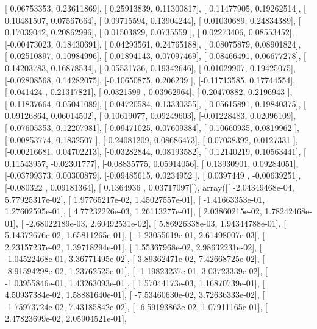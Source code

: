 \documentclass{article}
\begin{document}
       [ 0.06753353,  0.23611869],
       [ 0.25913839,  0.11300817],
       [ 0.11477905,  0.19262514],
       [ 0.10481507,  0.07567664],
       [ 0.09715594,  0.13904244],
       [ 0.01030689,  0.24834389],
       [ 0.17039042,  0.20862996],
       [ 0.01503829,  0.0735559 ],
       [ 0.02273406,  0.08553452],
       [-0.00473023,  0.18430691],
       [ 0.04293561,  0.24765188],
       [ 0.08075879,  0.08901824],
       [-0.02510897,  0.10984996],
       [ 0.01894143,  0.07097469],
       [ 0.08466491,  0.06677278],
       [ 0.14203783,  0.16878534],
       [-0.05531736,  0.19342646],
       [-0.01029907,  0.19425075],
       [-0.02808568,  0.14282075],
       [-0.10650875,  0.206239  ],
       [-0.11713585,  0.17744554],
       [-0.041424  ,  0.21317821],
       [-0.0321599 ,  0.03962964],
       [-0.20470882,  0.2196943 ],
       [-0.11837664,  0.05041089],
       [-0.04720584,  0.13330355],
       [-0.05615891,  0.19840375],
       [ 0.09126864,  0.06014502],
       [ 0.10619077,  0.09249603],
       [-0.01228483,  0.02096109],
       [-0.07605353,  0.12207981],
       [-0.09471025,  0.07609384],
       [-0.10660935,  0.0819962 ],
       [-0.00853774,  0.1832507 ],
       [-0.24081209,  0.08686473],
       [-0.07038392,  0.0127331 ],
       [-0.00216681,  0.04702213],
       [-0.03282844,  0.08193582],
       [ 0.12140219,  0.10563441],
       [ 0.11543957, -0.02301777],
       [-0.08835775,  0.05914056],
       [ 0.13930901,  0.09284051],
       [-0.03799373,  0.00300879],
       [-0.09485615,  0.0234952 ],
       [ 0.0397449 , -0.00639251],
       [-0.080322  ,  0.09181364],
       [ 0.1364936 ,  0.03717097]]), array([[ -2.04349468e-04,   5.77925317e-02],
       [  1.97765217e-02,   1.45027557e-01],
       [ -1.41663353e-01,   1.27602595e-01],
       [  4.77232226e-03,   1.26113277e-01],
       [  2.03860215e-02,   1.78242468e-01],
       [ -2.68022189e-03,   2.60492531e-02],
       [  5.86926338e-03,   1.94344788e-01],
       [  5.14372676e-02,   1.65811265e-01],
       [ -1.23055619e-01,   2.61498007e-03],
       [  2.23157237e-02,   1.39718294e-01],
       [  1.55367968e-02,   2.98632231e-02],
       [ -1.04522468e-01,   3.36771495e-02],
       [  3.89362471e-02,   7.42668725e-02],
       [ -8.91594298e-02,   1.23762525e-01],
       [ -1.19823237e-01,   3.03723339e-02],
       [ -1.03955846e-01,   1.43263093e-01],
       [  1.57044173e-03,   1.16870739e-01],
       [  4.50937384e-02,   1.58881640e-01],
       [ -7.53460630e-02,   3.72636333e-02],
       [ -1.75973724e-02,   7.43185842e-02],
       [ -6.59193863e-02,   1.07911165e-01],
       [  2.47823699e-02,   2.05904521e-01],
\end{document}
